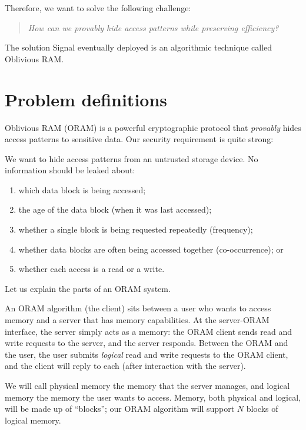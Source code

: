 Therefore, we want to solve the following challenge:

\begin{quote}
{\itshape How can we provably hide access patterns while preserving efficiency?}
\end{quote}

The solution Signal eventually deployed is an algorithmic technique
called Oblivious RAM.

\section{Problem definitions}
\label{oblivious-ram-problem-definitions}

Oblivious RAM (ORAM) is a powerful cryptographic protocol that
\emph{provably} hides access patterns to sensitive data.
Our security requirement is quite strong:

\begin{goal}{}{}
We want to hide access patterns from an untrusted storage device.
No information should be leaked about:
\begin{enumerate}
\item which data block is being
accessed;
\item the age of the data block (when it was last accessed);
\item whether a single block is being requested repeatedly (frequency);
\item whether data blocks are often being accessed together (co-occurrence);
or
\item whether each access is a read or a write.
\end{enumerate}
\end{goal}

Let us explain the parts of an ORAM system.

An ORAM algorithm (the \alert{client}) sits between a \alert{user} who
wants to access memory and a \alert{server} that has memory capabilities.
At the server-ORAM interface, the server simply acts as a memory: the
ORAM client sends read and write requests to the server, and the server
responds. Between the ORAM and the user, the user submits \emph{logical}
read and write requests to the ORAM client, and the client will reply to
each (after interaction with the server).

We will call \alert{physical} memory the memory that the server manages,
and \alert{logical} memory the memory the user wants to access. Memory,
both physical and logical, will be made up of ``blocks''; our ORAM
algorithm will support $N$ blocks of logical memory.

